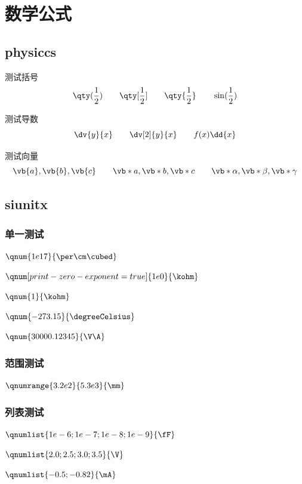 \chapter{数学公式}

\section{physiccs}

测试括号
\begin{equation}
    \qty(\frac{1}{2})\qquad
    \qty[\frac{1}{2}]\qquad
    \qty{\frac{1}{2}}\qquad
    \sin(\frac{1}{2})
\end{equation}

测试导数
\begin{equation}
    \dv{y}{x}\qquad
    \dv[2]{y}{x}\qquad
    f(x)\dd{x}
\end{equation}

测试向量
\begin{equation}
    \vb{a},\vb{b},\vb{c}\qquad
    \vb*{a},\vb*{b},\vb*{c}\qquad
    \vb*{\alpha},\vb*{\beta},\vb*{\gamma}
\end{equation}

\section{siunitx}

\subsection{单一测试}
$\qnum{1e17}{\per\cm\cubed}$

$\qnum[print-zero-exponent=true]{1e0}{\kohm}$

$\qnum{1}{\kohm}$

$\qnum{-273.15}{\degreeCelsius}$

$\qnum{30000.12345}{\V\A}$

\subsection{范围测试}
$\qnumrange{3.2e2}{5.3e3}{\mm}$

\subsection{列表测试}
$\qnumlist{1e-6;1e-7;1e-8;1e-9}{\fF}$

$\qnumlist{2.0;2.5;3.0;3.5}{\V}$

$\qnumlist{-0.5;-0.82}{\mA}$

